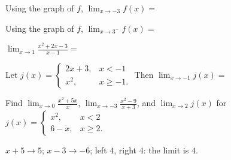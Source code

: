 \gWa
\begin{exo}{}
Using the graph of $f$, $\displaystyle\lim_{x\to-3}f(x)=$
\end{exo}
\begin{exo}{}
Using the graph of $f$, $\displaystyle\lim_{x\to3^-}f(x)=$
\end{exo}
\begin{exo}{}
$\displaystyle\lim_{x\to1}\frac{x^2+2x-3}{x-1}=$
\end{exo}
\begin{exo}{}
Let $j(x)=\begin{cases}2x+3, & x<-1\\ x^2, & x\ge-1.\end{cases}$ Then $\displaystyle\lim_{x\to-1}j(x)=$
\end{exo}
\begin{exo}{}
Find $\displaystyle\lim_{x\to0}\frac{x^2+5x}{x}$, $\displaystyle\lim_{x\to-3}\frac{x^2-9}{x+3}$, and $\displaystyle\lim_{x\to2}j(x)$ for $j(x)=\begin{cases}x^2, & x<2\\ 6-x, & x\ge2.\end{cases}$
\work{3cm}
\begin{solution}
$x+5\to5$; \;$x-3\to-6$; \;left $4$, right $4$: the limit is $4$.
\end{solution}
\end{exo}

